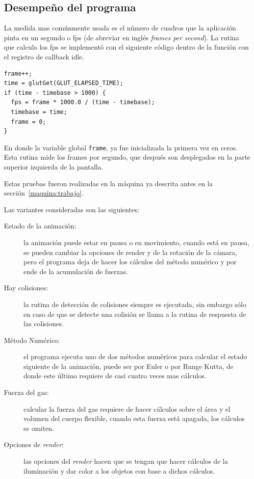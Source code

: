 \subsection{Desempeño del programa}

La medida mas comúnmente usada es el número de cuadros que la aplicación pinta en un segundo o fps (de abreviar en inglés \emph{\foreignlanguage{english}{frames per second}}). La rutina que calcula los fps se implementó con el siguiente código dentro de la función con el registro de callback idle.

\begin{verbatim}
frame++;
time = glutGet(GLUT_ELAPSED_TIME);
if (time - timebase > 1000) {
  fps = frame * 1000.0 / (time - timebase);
  timebase = time;
  frame = 0;
}\end{verbatim}

En donde la variable global \verb|frame|, ya fue inicializada la primera vez en ceros. Esta rutina mide los frames por segundo, que después son desplegados en la parte superior izquierda de la pantalla.

Estas pruebas fueron realizadas en la máquina ya descrita antes en la sección~\ref{maquina:trabajo}.

Las variantes consideradas son las siguientes:

\begin{description}
 \item[Estado de la animación:]la animación puede estar en pausa o en movimiento, cuando está en pausa, se pueden cambiar la opciones de render y de la rotación de la cámara, pero el programa deja de hacer los cálculos del método numérico y por ende de la acumulación de fuerzas.
 \item[Hay colisiones:]la rutina de detección de colisiones siempre es ejecutada, sin embargo sólo en caso de que se detecte una colisión se llama a la rutina de respuesta de las colisiones.
 \item[Método Numérico:]el programa ejecuta uno de dos métodos numéricos para calcular el estado siguiente de la animación, puede ser por Euler o por Runge Kutta, de donde este último requiere de casi cuatro veces mas cálculos.
 \item[Fuerza del gas:]calcular la fuerza del gas requiere de hacer cálculos sobre el área y el volumen del cuerpo flexible, cuando esta fuerza está apagada, los cálculos se omiten.
 \item[Opciones de \emph{\foreignlanguage{english}{render}}:]las opciones del \emph{\foreignlanguage{english}{render}} hacen que se tengan que hacer cálculos de la iluminación y dar color a los objetos con base a dichos cálculos.
\end{description}

